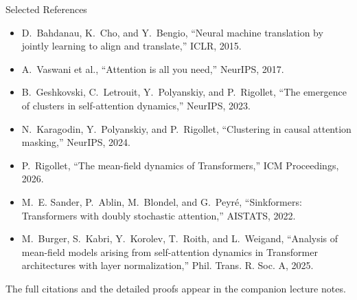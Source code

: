 \documentclass[aspectratio=169,11pt]{beamer}
\newcommand{\dd}{\,\mathrm{d}}
\newcommand{\norm}[1]{\left\lVert#1\right\rVert}
\newcommand{\ip}[2]{\left\langle#1,#2\right\rangle}
\newcommand{\blue}[1]{{\color{blue}#1}}
\begin{document}
\begin{frame}{Selected References}
\small
\begin{itemize}
\item D.~Bahdanau, K.~Cho, and Y.~Bengio, ``Neural machine translation by jointly learning to align and translate,'' ICLR, 2015.
\item A.~Vaswani et al., ``Attention is all you need,'' NeurIPS, 2017.
\item B.~Geshkovski, C.~Letrouit, Y.~Polyanskiy, and P.~Rigollet, ``The emergence of clusters in self-attention dynamics,'' NeurIPS, 2023.
\item N.~Karagodin, Y.~Polyanskiy, and P.~Rigollet, ``Clustering in causal attention masking,'' NeurIPS, 2024.
\item P.~Rigollet, ``The mean-field dynamics of Transformers,'' ICM Proceedings, 2026.
\item \blue{M.~E. Sander, P.~Ablin, M.~Blondel, and G.~Peyr\'e,
``Sinkformers: Transformers with doubly stochastic attention,'' AISTATS, 2022.}
\item \blue{M.~Burger, S.~Kabri, Y.~Korolev, T.~Roith, and L.~Weigand,
``Analysis of mean-field models arising from self-attention dynamics in
Transformer architectures with layer normalization,'' Phil. Trans. R. Soc. A,
2025.}
\end{itemize}

\vspace{1ex}
The full citations and the detailed proofs appear in the companion lecture notes.
\end{frame}


\end{document}
